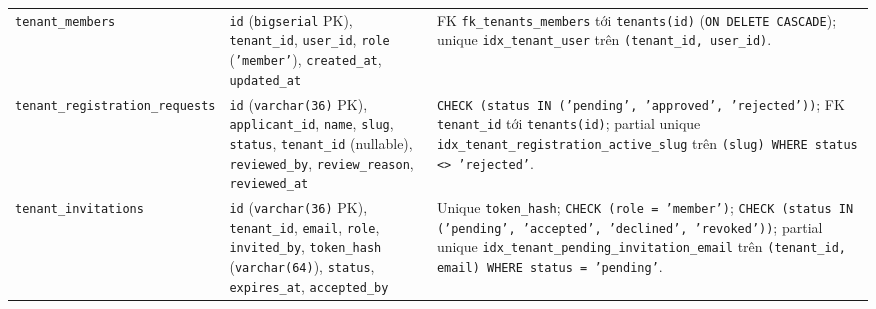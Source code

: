 \begin{table}[htbp]
\begin{tabularx}{\linewidth}{@{}
    >{\raggedright\arraybackslash}p{3.5cm}
    >{\raggedright\arraybackslash}p{4.9cm}
    >{\raggedright\arraybackslash}X@{}}
    \texttt{tenant\_\hspace{0pt}members} &
    \texttt{id} (\texttt{bigserial} PK), \texttt{tenant\_id}, \texttt{user\_id}, \texttt{role} (\texttt{'member'}), \texttt{created\_at}, \texttt{updated\_at} &
    FK \texttt{fk\_\hspace{0pt}tenants\_\hspace{0pt}members} tới \texttt{tenants(id)} (\texttt{ON DELETE CASCADE}); unique \texttt{idx\_\hspace{0pt}tenant\_\hspace{0pt}user} trên \texttt{(tenant\_id, user\_id)}. \\
    \texttt{tenant\_\hspace{0pt}registration\_\hspace{0pt}requests} &
    \texttt{id} (\texttt{varchar(36)} PK), \texttt{applicant\_id}, \texttt{name}, \texttt{slug}, \texttt{status}, \texttt{tenant\_id} (nullable), \texttt{reviewed\_by}, \texttt{review\_reason}, \texttt{reviewed\_at} &
    \texttt{CHECK (status IN ('pending', 'approved', 'rejected'))}; FK \texttt{tenant\_id} tới \texttt{tenants(id)}; partial unique \texttt{idx\_\hspace{0pt}tenant\_\hspace{0pt}registration\_\hspace{0pt}active\_\hspace{0pt}slug} trên \texttt{(slug) WHERE status <> 'rejected'}. \\
    \texttt{tenant\_\hspace{0pt}invitations} &
    \texttt{id} (\texttt{varchar(36)} PK), \texttt{tenant\_id}, \texttt{email}, \texttt{role}, \texttt{invited\_by}, \texttt{token\_hash} (\texttt{varchar(64)}), \texttt{status}, \texttt{expires\_at}, \texttt{accepted\_by} &
    Unique \texttt{token\_hash}; \texttt{CHECK (role = 'member')}; \texttt{CHECK (status IN ('pending', 'accepted', 'declined', 'revoked'))}; partial unique \texttt{idx\_\hspace{0pt}tenant\_\hspace{0pt}pending\_\hspace{0pt}invitation\_\hspace{0pt}email} trên \texttt{(tenant\_id, email) WHERE status = 'pending'}. \\
    \bottomrule
  \end{tabularx}
\end{table}

